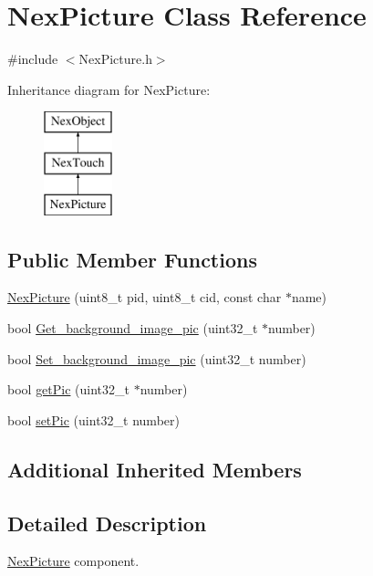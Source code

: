 \hypertarget{class_nex_picture}{\section{Nex\+Picture Class Reference}
\label{class_nex_picture}
}


{\ttfamily \#include $<$Nex\+Picture.\+h$>$}

Inheritance diagram for Nex\+Picture\+:\begin{figure}[H]
\begin{center}
\leavevmode
\includegraphics[height=3.000000cm]{class_nex_picture}
\end{center}
\end{figure}
\subsection*{Public Member Functions}
\begin{DoxyCompactItemize}
\item 
\hyperlink{class_nex_picture_aa6096defacd933e8bff5283c83200459}{Nex\+Picture} (uint8\+\_\+t pid, uint8\+\_\+t cid, const char $\ast$name)
\item 
bool \hyperlink{class_nex_picture_a0297c4a9544df9b0c37db0ea894d699f}{Get\+\_\+background\+\_\+image\+\_\+pic} (uint32\+\_\+t $\ast$number)
\item 
bool \hyperlink{class_nex_picture_a531e22f70dbf0dcaf6e114581364acea}{Set\+\_\+background\+\_\+image\+\_\+pic} (uint32\+\_\+t number)
\item 
bool \hyperlink{class_nex_picture_a11bd68ef9fe1d03d9e0d02ef1c7527e9}{get\+Pic} (uint32\+\_\+t $\ast$number)
\item 
bool \hyperlink{class_nex_picture_ab1c6adff615d48261ce10c2095859abd}{set\+Pic} (uint32\+\_\+t number)
\end{DoxyCompactItemize}
\subsection*{Additional Inherited Members}


\subsection{Detailed Description}
\hyperlink{class_nex_picture}{Nex\+Picture} component. 

